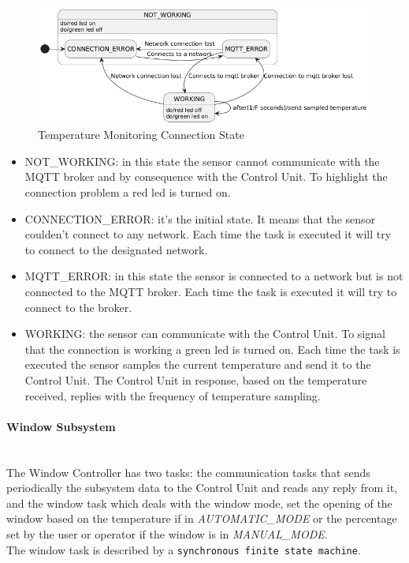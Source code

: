 \documentclass[a4paper,12pt]{report}
\begin{document}
            \begin{figure}[H]
                \centering{}
                \includegraphics[width=\textwidth]{uml/img/TemperatureCommunicationUML.png}
                \caption{Temperature Monitoring Connection State}
                \label{img:connection_state}
            \end{figure}

            \begin{itemize}
                \item NOT\_WORKING: in this state the sensor cannot communicate with the MQTT broker and by consequence with the Control 
                Unit. To highlight the connection problem a red led is turned on.
                \item CONNECTION\_ERROR: it's the initial state. It means that the sensor coulden't connect to any network. Each time the 
                task is executed it will try to connect to the designated network.
                \item MQTT\_ERROR: in this state the sensor is connected to a network but is not connected to the MQTT broker. Each time 
                the task is executed it will try to connect to the broker.
                \item WORKING: the sensor can communicate with the Control Unit. To signal that the connection is working a green led is 
                turned on. Each time the task is executed the sensor samples the current temperature and send it to the Control Unit. 
                The Control Unit in response, based on the temperature received, replies with the frequency of temperature sampling.
            \end{itemize}

        \newpage
        \paragraph{Window Subsystem\\}
            \ \\
            The Window Controller has two tasks: the communication tasks that sends periodically the subsystem data to the Control Unit 
            and reads any reply from it, and the window task which deals with the window mode, set the opening of the window based on 
            the temperature if in \textit{AUTOMATIC\_MODE} or the percentage set by the user or operator if the window is in 
            \textit{MANUAL\_MODE}.\\
            The window task is described by a \texttt{synchronous finite state machine}.
\end{document}

